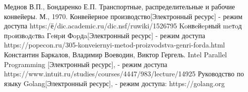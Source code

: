 \documentclass[12pt]{report}
\begin{document}
 \begin{thebibliography}{3}
 Меднов В.П., Бондаренко Е.П. Транспортные, распределительные и рабочие конвейеры. М., 1970.
 Конвейерное производство[Электронный ресурс] - режим доступа https:/ё/dic.academic.ru/dic.nsf/ruwiki/1526795
 Koнвeйepный meтoд пpoизвoдcтвa Гeнpи Фopдa[Электронный ресурс] - режим доступа https://popecon.ru/305-konveiernyi-metod-proizvodstva-genri-forda.html
Константин Баркалов, Владимир Воеводин, Виктор Гергель. Intel Parallel Programming [Электронный ресурс], - режим доступа https://www.intuit.ru/studies/courses/4447/983/lecture/14925
Руководство по языку Golang[Электронный ресурс], - режим доступа: 
https://golang.org
\end{thebibliography}
\end{document}
